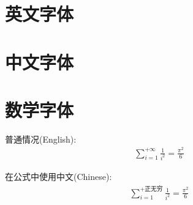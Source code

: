 \documentclass[10pt]{article}
\begin{document}
\section{英文字体}
\lipsum[1] 

\section{中文字体}
\zhlipsum[1] 

\section{数学字体}
普通情况(English): 
\begin{align}
    \sum_{i=1}^{+\infty}{\frac{1}{i^2}} = \frac{\pi^2}{6}
\end{align}

在公式中使用中文(Chinese): 
\begin{align}
    \sum_{i=1}^{+正无穷}{\frac{1}{i^2}} = \frac{\pi^2}{6}
\end{align}
\end{document}
